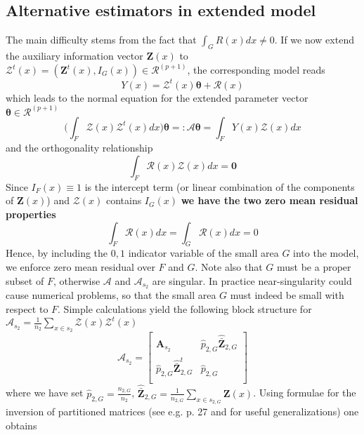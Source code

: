 \documentclass[a4paper,12pt,leqno, titlepage]{article}
\begin{document}
\subsection{Alternative estimators in extended model}
 The main difficulty stems from the fact that
$\int_{G}R(x)dx \ne 0$. If we now extend the auxiliary information vector  $\pmb{Z}(x)$ to $\pmb{\mathcal{Z}}^t(x)=(\pmb{Z}^t(x),I_G(x))\in{\mathcal{R}}^{(p+1)}$, the corresponding model reads
\begin{equation}\label{extendemodel1}
Y(x)=\pmb{\mathcal{Z}}^t(x)\pmb{\theta} +\mathcal{R}(x)
 \end{equation}
 which leads to the normal equation for the extended parameter vector $\pmb{\theta}\in{\mathcal{R}}^{(p+1)}$
$$\Big(\int_F\pmb{\mathcal{Z}}(x)\pmb{\mathcal{Z}}^t(x)dx\Big)\pmb{\theta}=:
\pmb{\mathcal{A}}\pmb{\theta}=\int_{F}Y(x)\pmb{\mathcal{Z}}(x)dx$$ and the orthogonality relationship
$$\int_{F}\mathcal{R}(x)\pmb{\mathcal{Z}}(x)dx=\pmb{0}$$
 Since $I_F(x)\equiv 1$ is the intercept term (or linear combination of the components of $\pmb{Z}(x)$) and $\pmb{\mathcal{Z}}(x)$ contains $I_G(x)$ \textbf{we have the two zero mean residual properties}
$$\int_F \mathcal{R}(x)dx=\int_G \mathcal{R}(x)dx=0$$
Hence, by including the $0,1$ indicator variable of the small area $G$ into the model, we enforce zero mean residual over $F$ and $G$. Note also that $G$ must be a proper subset of $F$, otherwise $\pmb{\mathcal{A}}$ and $\pmb{\mathcal{A}}_{s_2}$ are singular. In practice near-singularity could cause numerical problems, so that the small area $G$ must indeed be small with respect to $F$. Simple calculations yield the following block structure for $\pmb{\mathcal{A}}_{s_2}=\frac{1}{n_2}\sum_{x\in{s_2}}\pmb{\mathcal{Z}}(x)\pmb{\mathcal{Z}}^t(x)$
\begin{equation}\label{tildeAs2}
 \pmb{\mathcal{A}}_{s_2}=
\left[ \begin {array}{ll}
\pmb{A}_{s_2}& \hat{p}_{2,G}\hat{\bar{\pmb{Z}}}_{2,G} \\
 \hat{p}_{2,G}\hat{\bar{\pmb{Z}}}_{2,G}^t & \hat{p}_{2,G} \\ \end {array} \right]
\end{equation}
where we have set $\hat{p}_{2,G}=\frac{n_{2,G}}{n_2}$, $\hat{\bar{\pmb{Z}}}_{2,G}=\frac{1}{n_{2,G}}\sum_{x\in{s_{2,G}}}\pmb{Z}(x)$. Using formulae for the inversion of partitioned matrices (see e.g. \cite{searle} p. 27 and \cite{tian} for useful generalizations) one obtains
\end{document}
